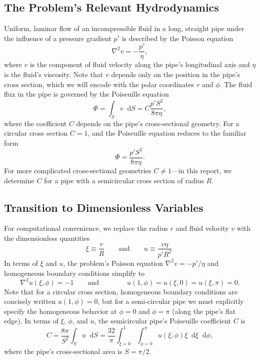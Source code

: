 \documentclass[11pt, a4paper]{article}
\newcommand{\diff}{\mathop{}\!\mathrm{d}} %
\newcommand{\eqtext}[1]{\qquad \text{#1} \qquad}
\renewcommand{\laplacian}{\nabla^{2}}
\newcommand{\Pois}{Poiseuille\xspace}  %
\begin{document}
\subsection{The Problem's Relevant Hydrodynamics}
Uniform, laminar flow of an incompressible fluid in a long, straight pipe under the influence of a pressure gradient $ p' $ is described by the Poisson equation
\begin{equation*}
	\laplacian v = - \frac{p'}{\eta},
\end{equation*}
where $ v $ is the component of fluid velocity along the pipe's longitudinal axis and $ \eta $ is the fluid's viscosity. Note that $ v $ depends only on the position in the pipe's cross section, which we will encode with the polar coordinates $ r $ and $ \phi $. The fluid flux in the pipe is governed by the \Pois equation
\begin{equation*}
	\Phi = \int_{S}v \diff S = C \frac{p' S^{2}}{8 \pi \eta},
\end{equation*}
where the coefficient $ C $ depends on the pipe's cross-sectional geometry. For a circular cross section $ C = 1 $, and the \Pois equation reduces to the familiar form
\begin{equation*}
	\Phi = \frac{p' S^{2}}{8 \pi \eta}.
\end{equation*}
For more complicated cross-sectional geometries $ C \neq 1 $---in this report, we determine $ C $ for a pipe with a semicircular cross section of radius $ R $.

\subsection{Transition to Dimensionless Variables}
For computational convenience, we replace the radius $ r $ and fluid velocity $ v $ with the dimensionless quantities
\begin{equation*}
	\xi \equiv \frac{r}{R} \eqtext{and} u \equiv \frac{v\eta}{p'R^{2}}.
\end{equation*}
In terms of $ \xi $ and $ u $, the problem's Poisson equation $ \laplacian v = -p'/ \eta $ and homogeneous boundary conditions simplify to
\begin{equation*}
	\laplacian u(\xi, \phi) = -1 \eqtext{and} \qquad u(1, \phi) = u(\xi, 0) = u(\xi, \pi) = 0.
\end{equation*}
Note that for a circular cross section, homogeneous boundary conditions are concisely written $ u(1, \phi) = 0 $, but for a semi-circular pipe we must explicitly specify the homogeneous behavior at $ \phi = 0 $ and $ \phi = \pi $ (along the pipe's flat edge). In terms of $ \xi $, $ \phi $, and $ u $, the semicircular pipe's \Pois coefficient $ C $ is
\begin{equation*}
	C = \frac{8\pi}{S^{2}} \int_{S}u \diff S = \frac{32}{\pi} \int_{\xi = 0}^{1}\int_{\phi=0}^{\pi} u(\xi, \phi)\xi \diff \xi \diff \phi,
\end{equation*}
where the pipe's cross-sectional area is $ S = \pi/2 $.
\end{document}
